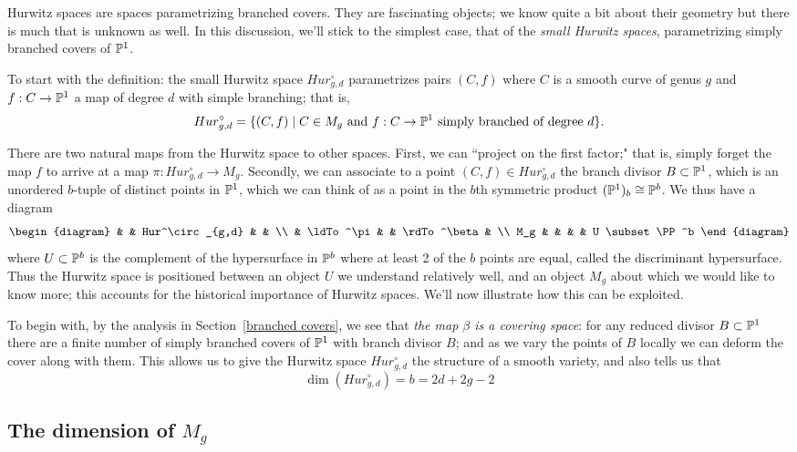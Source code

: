 Hurwitz spaces are spaces parametrizing branched covers. They are fascinating objects; we know quite a bit about their geometry but there is much that is unknown as well. In this discussion, we'll stick to the simplest case, that of the \emph{small Hurwitz spaces}, parametrizing simply branched covers of ${\mathbb P}^1$.

To start with the definition: the small Hurwitz space $Hur^\circ_{g,d}$ parametrizes pairs $(C, f)$ where $C$ is a smooth curve of genus $g$ and $f : C \to {\mathbb P}^1$ a map of degree $d$ with simple branching; that is,
$$
Hur^\circ_{g,d} = \{ (C, f) \mid C \in M_g  \text{ and } f:C \to {\mathbb P}^1 \text{ simply branched of degree } d\}.
$$

There are two natural maps from the Hurwitz space to other spaces. First, we can ``project on the first factor;" that is, simply forget the map $f$ to arrive at a map $\pi : Hur^\circ_{g,d} \to M_g$. Secondly, we can associate to a point $(C,f) \in Hur^\circ_{g,d}$ the branch divisor $B \subset {\mathbb P}^1$, which is an unordered $b$-tuple of distinct points in ${\mathbb P}^1$, which we can think of as a point in the $b$th symmetric product $({\mathbb P}^1)_b  \cong {\mathbb P}^b$. We thus have a diagram
$$
\begin{diagram}
& & Hur^\circ_{g,d} & & \\
& \ldTo^\pi & & \rdTo^\beta & \\
M_g & & & & U \subset \PP^b
\end{diagram}
$$
where $U \subset {\mathbb P}^b$ is the complement of the hypersurface in ${\mathbb P}^{b}$ where at least 2 of the
$b$ points are equal, called the discriminant hypersurface. Thus the Hurwitz space is positioned between an object $U$ we understand relatively well, and an object $M_g$ about which we would like to know more; this accounts for the historical importance of Hurwitz spaces. We'll now illustrate how this can be exploited.

To begin with, by the analysis in Section~\ref{branched covers}, we see that \emph{the map $\beta$ is a covering space}: for any reduced divisor $B \subset {\mathbb P}^1$ there are a finite number of simply branched covers of ${\mathbb P}^1$ with branch divisor $B$; and as we vary the points of $B$ locally we can deform the cover along with them. This allows us to give the Hurwitz space $Hur^\circ_{g,d}$ the structure of a smooth variety, and also tells us that
$$
\dim(Hur^\circ_{g,d}) = b = 2d+2g-2
$$

\subsection{The dimension of $M_g$} 

